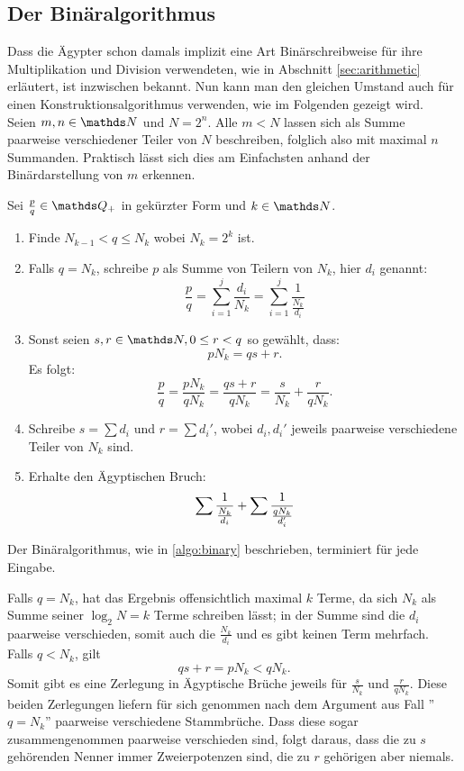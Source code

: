 \subsection{Der Binäralgorithmus}

Dass die Ägypter schon damals implizit eine Art Binärschreibweise für ihre Multiplikation und Division verwendeten, wie in Abschnitt \ref{sec:arithmetic} erläutert, ist inzwischen bekannt. Nun kann man den gleichen Umstand auch für einen Konstruktionsalgorithmus verwenden, wie im Folgenden gezeigt wird.\\
Seien $m, n \in \N$ und $N = 2^n$. Alle $m < N$ lassen sich als Summe paarweise verschiedener Teiler von $N$ beschreiben, folglich also mit maximal $n$ Summanden. Praktisch lässt sich dies am Einfachsten anhand der Binärdarstellung von $m$ erkennen.

\begin{algorithm}\label{algo:binary}
	Sei $\frac{p}{q} \in \Q_+$ in gekürzter Form und $k \in \N$.
	\begin{enumerate}
		\item Finde $N_{k-1} < q \leq N_k$ wobei $N_k=2^k$ ist.
		\item Falls $q = N_k$, schreibe $p$ als Summe von Teilern von $N_k$, hier $d_i$ genannt:
		$$\frac{p}{q} = \sum_{i=1}^{j} \frac{d_i}{N_k}=  \sum_{i = 1}^{j}\frac{1}{\frac{N_k}{d_i}}$$
		\item Sonst seien $s, r \in \N, 0 \leq r < q$ so gewählt, dass:
		$$pN_k = qs+r.$$
		Es folgt:
		$$\frac{p}{q} = \frac{p N_k}{q N_k} = \frac{qs + r}{q N_k} = \frac{s}{N_k} + \frac{r}{q N_k}.$$
		\item Schreibe $s = \sum d_i$ und $r = \sum d_i'$, wobei $d_i, d_i'$ jeweils paarweise verschiedene Teiler von $N_k$ sind.
		\item Erhalte den Ägyptischen Bruch:
		$$\sum \frac{1}{\frac{N_k}{d_i}} + \sum \frac{1}{\frac{q N_k}{d_i'}}$$
	\end{enumerate}
\end{algorithm}

\begin{satz}\label{satz:termination_binary}
	Der Binäralgorithmus, wie in \ref{algo:binary} beschrieben, terminiert für jede Eingabe.
\end{satz}

\begin{bew}
	Falls $q = N_k$, hat das Ergebnis offensichtlich maximal $k$ Terme, da sich $N_k$ als Summe seiner $\log_2 N = k$ Terme schreiben lässt; in der Summe sind die $d_i$ paarweise verschieden, somit auch die $\frac{N_k}{d_i}$ und es gibt keinen Term mehrfach.\\
	Falls $q < N_k$, gilt
	$$qs+r = p N_k < q N_k.$$
	Somit gibt es eine Zerlegung in Ägyptische Brüche jeweils für $\frac{s}{N_k}$ und $\frac{r}{qN_k}$. Diese beiden Zerlegungen liefern für sich genommen nach dem Argument aus Fall ''$q = N_k$'' paarweise verschiedene Stammbrüche. Dass diese sogar zusammengenommen paarweise verschieden sind, folgt daraus, dass die zu $s$ gehörenden Nenner immer Zweierpotenzen sind, die zu $r$ gehörigen aber niemals.
\end{bew}


